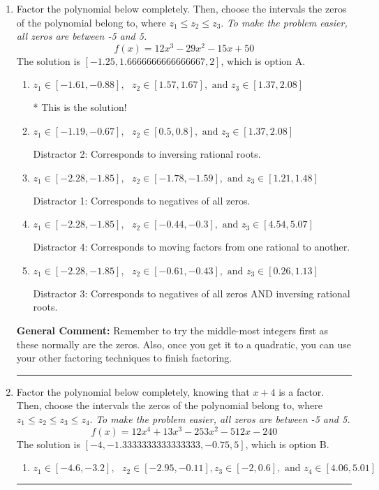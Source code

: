 \documentclass{extbook}[14pt]
\newcommand{\litem}[1]{\item #1

\rule{\textwidth}{0.4pt}}
\begin{document}
\begin{enumerate}\litem{
Factor the polynomial below completely. Then, choose the intervals the zeros of the polynomial belong to, where $z_1 \leq z_2 \leq z_3$. \textit{To make the problem easier, all zeros are between -5 and 5.}
\[ f(x) = 12x^{3} -29 x^{2} -15 x + 50 \]The solution is \( [-1.25, 1.6666666666666667, 2] \), which is option A.\begin{enumerate}[label=\Alph*.]
\item \( z_1 \in [-1.61, -0.88], \text{   }  z_2 \in [1.57, 1.67], \text{   and   } z_3 \in [1.37, 2.08] \)

* This is the solution!
\item \( z_1 \in [-1.19, -0.67], \text{   }  z_2 \in [0.5, 0.8], \text{   and   } z_3 \in [1.37, 2.08] \)

 Distractor 2: Corresponds to inversing rational roots.
\item \( z_1 \in [-2.28, -1.85], \text{   }  z_2 \in [-1.78, -1.59], \text{   and   } z_3 \in [1.21, 1.48] \)

 Distractor 1: Corresponds to negatives of all zeros.
\item \( z_1 \in [-2.28, -1.85], \text{   }  z_2 \in [-0.44, -0.3], \text{   and   } z_3 \in [4.54, 5.07] \)

 Distractor 4: Corresponds to moving factors from one rational to another.
\item \( z_1 \in [-2.28, -1.85], \text{   }  z_2 \in [-0.61, -0.43], \text{   and   } z_3 \in [0.26, 1.13] \)

 Distractor 3: Corresponds to negatives of all zeros AND inversing rational roots.
\end{enumerate}

\textbf{General Comment:} Remember to try the middle-most integers first as these normally are the zeros. Also, once you get it to a quadratic, you can use your other factoring techniques to finish factoring.
}
\litem{
Factor the polynomial below completely, knowing that $x+4$ is a factor. Then, choose the intervals the zeros of the polynomial belong to, where $z_1 \leq z_2 \leq z_3 \leq z_4$. \textit{To make the problem easier, all zeros are between -5 and 5.}
\[ f(x) = 12x^{4} +13 x^{3} -253 x^{2} -512 x -240 \]The solution is \( [-4, -1.3333333333333333, -0.75, 5] \), which is option B.\begin{enumerate}[label=\Alph*.]
\item \( z_1 \in [-4.6, -3.2], \text{   }  z_2 \in [-2.95, -0.11], z_3 \in [-2, 0.6], \text{   and   } z_4 \in [4.06, 5.01] \)


\end{enumerate}}
\end{enumerate}
\end{document}

